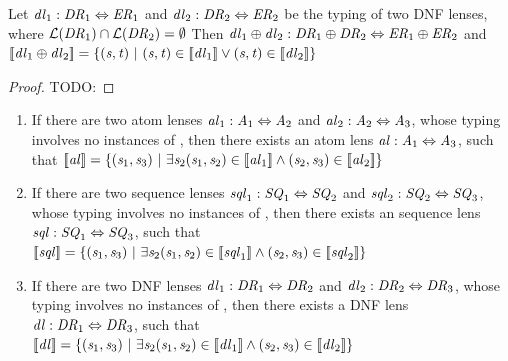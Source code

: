 \documentclass[numbers]{sigplanconf}
\begin{document}
\begin{lemma}
  Let $\mathit{dl}_1 : \mathit{DR}_1 \Leftrightarrow \mathit{ER}_1$ and
  $\mathit{dl}_2 : \mathit{DR}_2 \Leftrightarrow \mathit{ER}_2$ be the typing of
  two DNF lenses, where
  $\mathcal{L}(\mathit{DR}_1) \cap \mathcal{L}(\mathit{DR}_2) = \emptyset$
  Then $\mathit{dl}_1\oplus\mathit{dl}_2 :
  \mathit{DR}_1\oplus\mathit{DR}_2 \Leftrightarrow
  \mathit{ER}_1\oplus\mathit{ER}_2$ and
  $[ \! [\mathit{dl}_1\oplus\mathit{dl}_2] \! ] =
  \{(\mathit{s},\mathit{t}) ~|~
  (\mathit{s},\mathit{t})\in[ \! [\mathit{dl}_1] \! ]
  \vee(\mathit{s},\mathit{t})\in[ \! [\mathit{dl}_2] \! ]\}$
\end{lemma}
\begin{proof}
  TODO:
\end{proof}

\begin{lemma}\leavevmode
\label{lem:composition-completeness}
\begin{enumerate}
\item If there are two atom lenses
$\mathit{al}_1 : \mathit{A}_1 \Leftrightarrow \mathit{A}_2$ and
$\mathit{al}_2 : \mathit{A}_2 \Leftrightarrow \mathit{A}_3$,
whose typing involves no instances of \DNFRewriteLensRule{},
then there exists an atom lens
$\mathit{al} : \mathit{A}_1 \Leftrightarrow \mathit{A}_3$, such that
$[ \! [\mathit{al}] \! ]=\{(\mathit{s}_1,\mathit{s}_3)~|~
\exists\mathit{s}_2
(\mathit{s}_1,\mathit{s}_2)\in[ \! [\mathit{al}_1] \! ]\wedge
(\mathit{s}_2,\mathit{s}_3)\in[ \! [\mathit{al}_2] \! ]\}$

\item If there are two sequence lenses
$\mathit{sql}_1 : \mathit{SQ}_1 \Leftrightarrow \mathit{SQ}_2$ and
$\mathit{sql}_2 : \mathit{SQ}_2 \Leftrightarrow \mathit{SQ}_3$,
whose typing involves no instances of \DNFRewriteLensRule{},
then there exists an sequence lens
$\mathit{sql} : \mathit{SQ}_1 \Leftrightarrow \mathit{SQ}_3$, such that
$[ \! [\mathit{sql}] \! ]=\{(\mathit{s}_1,\mathit{s}_3)~|~
\exists\mathit{s}_2
(\mathit{s}_1,\mathit{s}_2)\in[ \! [\mathit{sql}_1] \! ]\wedge
(\mathit{s}_2,\mathit{s}_3)\in[ \! [\mathit{sql}_2] \! ]\}$

\item If there are two DNF lenses
$\mathit{dl}_1 : \mathit{DR}_1 \Leftrightarrow \mathit{DR}_2$ and
$\mathit{dl}_2 : \mathit{DR}_2 \Leftrightarrow \mathit{DR}_3$,
whose typing involves no instances of \DNFRewriteLensRule{},
then there exists a DNF lens
$\mathit{dl} : \mathit{DR}_1 \Leftrightarrow \mathit{DR}_3$, such that
$[ \! [\mathit{dl}] \! ]=\{(\mathit{s}_1,\mathit{s}_3)~|~
\exists\mathit{s}_2
(\mathit{s}_1,\mathit{s}_2)\in[ \! [\mathit{dl}_1] \! ]\wedge
(\mathit{s}_2,\mathit{s}_3)\in[ \! [\mathit{dl}_2] \! ]\}$
\end{enumerate}
\end{lemma}
\end{document}
